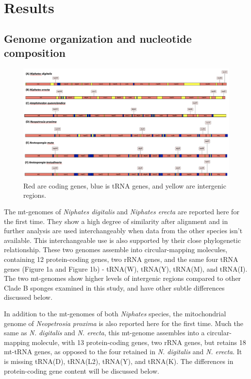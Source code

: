 \documentclass[../main.tex]{subfiles}
\begin{document}
\section{Results}

\subsection {Genome organization and nucleotide composition}

\begin{figure}[htp]
    \centering
    \includegraphics[width=1.0\textwidth]{Figures/figure 1 replace.png}
    \caption{Red are coding genes, blue is tRNA genes, and yellow are intergenic regions.}
\end{figure}

The mt-genomes of \emph{Niphates digitalis} and \emph{Niphates erecta} are reported here for the first time. They show a high degree of similarity after alignment and in further analysis are used interchangeably when data from the other species isn't available. This interchangeable use is also supported by their close phylogenetic relationship. These two genomes assemble into circular-mapping molecules, containing 12 protein-coding genes, two rRNA genes, and the same four tRNA genes (Figure 1a and Figure 1b) - tRNA(W), tRNA(Y), tRNA(M), and tRNA(I). The two mt-genomes show higher levels of intergenic regions compared to other Clade B sponges examined in this study, and have other subtle differences discussed below.

In addition to the mt-genomes of both \emph{Niphates} species, the mitochondrial genome of \emph{Neopetrosia proxima} is also reported here for the first time. Much the same as \emph{N. digitalis} and \emph{N. erecta}, this mt-genome assembles into a circular-mapping molecule, with 13 protein-coding genes, two rRNA genes, but retains 18 mt-tRNA genes, as opposed to the four retained in \emph{N. digitalis} and \emph{N. erecta}. It is missing tRNA(D), tRNA(L2), tRNA(Y), and tRNA(K). The differences in protein-coding gene content will be discussed below.
\end{document}
